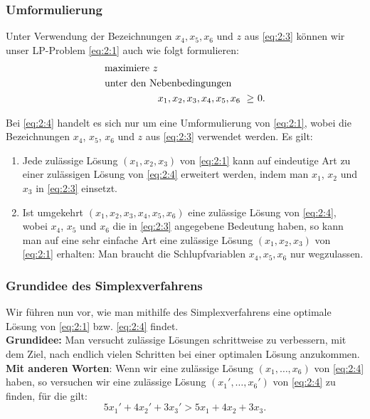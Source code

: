 \documentclass[smaller]{beamer}
\begin{document}
\begin{frame}
 \frametitle{Umformulierung}
 Unter Verwendung der Bezeichnungen $x_4,x_5,x_6$ und $z$ aus \eqref{eq:2:3} können wir unser LP-Problem \eqref{eq:2:1} auch wie folgt formulieren:
\begin{align}
\begin{alignedat}{3}
\label{eq:2:4}
& \text{maximiere $z$} & & & \\
& \rlap{unter den Nebenbedingungen} & & &\\
&& x_1,x_2,x_3,x_4,x_5,x_6 &\ \geq &\ 0.
\end{alignedat}
\end{align}

Bei \eqref{eq:2:4} handelt es sich nur um eine \alert{Umformulierung} von \eqref{eq:2:1}, wobei die Bezeichnungen $x_4$, $x_5$, $x_6$ und $z$ aus \eqref{eq:2:3} verwendet werden. Es gilt:
\begin{enumerate}[1.]
\item Jede zulässige Lösung $(x_1,x_2,x_3)$ von \eqref{eq:2:1} kann auf eindeutige Art zu einer zulässigen Lösung von \eqref{eq:2:4} erweitert werden, indem man $x_1$, $x_2$ und $x_3$ in \eqref{eq:2:3} einsetzt.
\item Ist umgekehrt $(x_1,x_2,x_3,x_4,x_5,x_6)$ eine zulässige Lösung von \eqref{eq:2:4}, wobei $x_4$, $x_5$ und $x_6$ die in \eqref{eq:2:3} angegebene Bedeutung haben, so kann man auf eine sehr einfache Art eine zulässige Lösung $(x_1,x_2,x_3)$ von \eqref{eq:2:1} erhalten: Man braucht die Schlupfvariablen $x_4,x_5,x_6$ nur wegzulassen.
\end{enumerate}
\end{frame}

\begin{frame}
 \frametitle{Grundidee des Simplexverfahrens}
 Wir führen nun vor, wie man mithilfe des Simplexverfahrens eine optimale Lösung von \eqref{eq:2:1} bzw. \eqref{eq:2:4} findet. \\
 \vspace*{0.2cm}
 \textbf{Grundidee:} Man versucht zulässige Lösungen schrittweise zu verbessern, mit dem Ziel, nach endlich vielen Schritten bei einer optimalen Lösung anzukommen. \\
 \textbf{Mit anderen Worten}: Wenn wir eine zulässige Lösung $(x_1,\ldots,x_6)$ von \eqref{eq:2:4} haben, so versuchen wir eine zulässige Lösung $(x_1',\ldots,x_6')$ von \eqref{eq:2:4} zu finden, für die gilt:
 \[
 5 x_1' + 4x_2' + 3 x_3' > 5x_1 + 4x_2 + 3x_3.
 \]
\end{frame}
\end{document}
